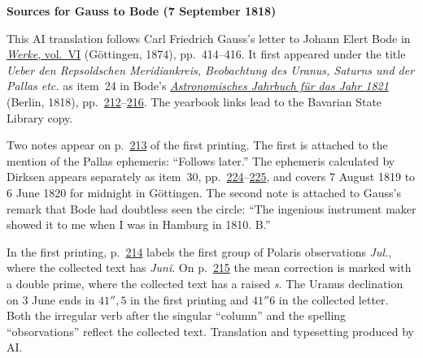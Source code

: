 \clearpage\thispagestyle{empty}
\begin{center}\textbf{Sources for Gauss to Bode (7 September 1818)}\end{center}
\noindent This AI translation follows Carl Friedrich Gauss’s letter to Johann Elert Bode in \href{https://gdz.sub.uni-goettingen.de/id/PPN236007467}{\textit{Werke}, vol.~VI} (Göttingen, 1874), pp.~414--416. It first appeared under the title \textit{Ueber den Repsoldschen Meridiankreis, Beobachtung des Uranus, Saturns und der Pallas etc.} as item~24 in Bode’s \href{https://api.digitale-sammlungen.de/iiif/image/v2/bsb10538350_00003/full/1600,/0/default.jpg}{\textit{Astronomisches Jahrbuch für das Jahr 1821}} (Berlin, 1818), pp.~\href{https://api.digitale-sammlungen.de/iiif/image/v2/bsb10538350_00218/full/1600,/0/default.jpg}{212}--\href{https://api.digitale-sammlungen.de/iiif/image/v2/bsb10538350_00222/full/1600,/0/default.jpg}{216}. The yearbook links lead to the Bavarian State Library copy.
\par\smallskip\noindent Two notes appear on p.~\href{https://api.digitale-sammlungen.de/iiif/image/v2/bsb10538350_00219/full/1600,/0/default.jpg}{213} of the first printing. The first is attached to the mention of the Pallas ephemeris: “Follows later.” The ephemeris calculated by Dirksen appears separately as item~30, pp.~\href{https://api.digitale-sammlungen.de/iiif/image/v2/bsb10538350_00230/full/1600,/0/default.jpg}{224}--\href{https://api.digitale-sammlungen.de/iiif/image/v2/bsb10538350_00231/full/1600,/0/default.jpg}{225}, and covers 7 August 1819 to 6 June 1820 for midnight in Göttingen. The second note is attached to Gauss’s remark that Bode had doubtless seen the circle: “The ingenious instrument maker showed it to me when I was in Hamburg in 1810. B.”
\par\smallskip\noindent In the first printing, p.~\href{https://api.digitale-sammlungen.de/iiif/image/v2/bsb10538350_00220/full/1600,/0/default.jpg}{214} labels the first group of Polaris observations \textit{Jul.}, where the collected text has \textit{Juni}. On p.~\href{https://api.digitale-sammlungen.de/iiif/image/v2/bsb10538350_00221/full/1600,/0/default.jpg}{215} the mean correction is marked with a double prime, where the collected text has a raised \textit{s}. The Uranus declination on 3 June ends in $41'',5$ in the first printing and $41''6$ in the collected letter. Both the irregular verb after the singular “column” and the spelling “obsorvations” reflect the collected text. Translation and typesetting produced by AI.
\clearpage
